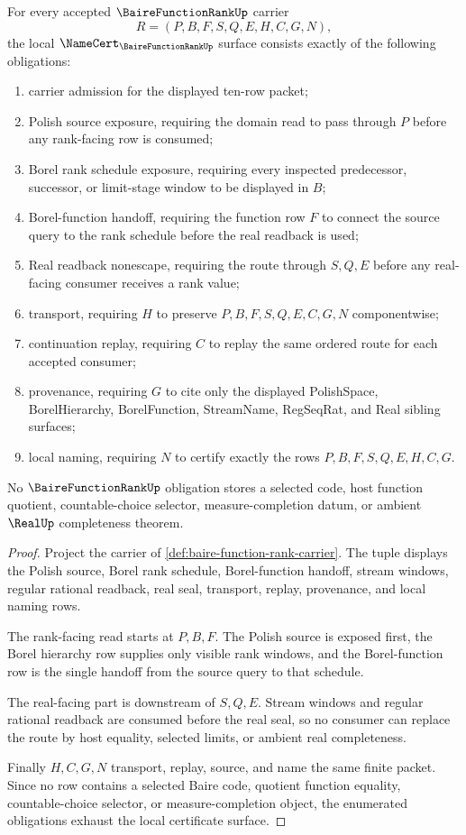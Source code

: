 \begin{theorem}
\label{thm:baire-function-rank-namecert-obligations}
For every accepted $\BaireFunctionRankUp$ carrier
$$
R=(P,B,F,S,Q,E,H,C,G,N),
$$
the local $\NameCert_{\BaireFunctionRankUp}$ surface consists exactly of the following obligations:
\begin{enumerate}
\item carrier admission for the displayed ten-row packet;
\item Polish source exposure, requiring the domain read to pass through $P$ before any rank-facing row is consumed;
\item Borel rank schedule exposure, requiring every inspected predecessor, successor, or limit-stage window to be displayed in $B$;
\item Borel-function handoff, requiring the function row $F$ to connect the source query to the rank schedule before the real readback is used;
\item Real readback nonescape, requiring the route through $S,Q,E$ before any real-facing consumer receives a rank value;
\item transport, requiring $H$ to preserve $P,B,F,S,Q,E,C,G,N$ componentwise;
\item continuation replay, requiring $C$ to replay the same ordered route for each accepted consumer;
\item provenance, requiring $G$ to cite only the displayed PolishSpace, BorelHierarchy, BorelFunction, StreamName, RegSeqRat, and Real sibling surfaces;
\item local naming, requiring $N$ to certify exactly the rows $P,B,F,S,Q,E,H,C,G$.
\end{enumerate}
No $\BaireFunctionRankUp$ obligation stores a selected code, host function quotient, countable-choice selector, measure-completion datum, or ambient $\RealUp$ completeness theorem.
\end{theorem}
\begin{proof}
Project the carrier of \autoref{def:baire-function-rank-carrier}. The tuple displays the Polish source, Borel rank schedule, Borel-function handoff, stream windows, regular rational readback, real seal, transport, replay, provenance, and local naming rows.

The rank-facing read starts at $P,B,F$. The Polish source is exposed first, the Borel hierarchy row supplies only visible rank windows, and the Borel-function row is the single handoff from the source query to that schedule.

The real-facing part is downstream of $S,Q,E$. Stream windows and regular rational readback are consumed before the real seal, so no consumer can replace the route by host equality, selected limits, or ambient real completeness.

Finally $H,C,G,N$ transport, replay, source, and name the same finite packet. Since no row contains a selected Baire code, quotient function equality, countable-choice selector, or measure-completion object, the enumerated obligations exhaust the local certificate surface.
\end{proof}

